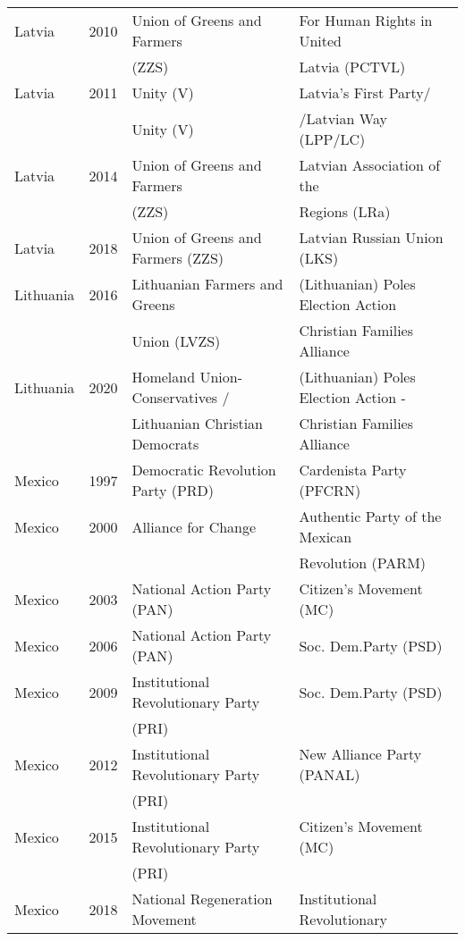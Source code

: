 {\begin{longtable}{|l|c|l|l|}
  Latvia & 2010 &   Union of Greens and Farmers     &   For Human Rights in United   \\ 
          &   &     (ZZS)   &    Latvia (PCTVL) \\ 
  Latvia & 2011 &   Unity (V) &   Latvia's First Party/   \\ 
         &      &   Unity (V) &    /Latvian Way (LPP/LC)   \\ 
  Latvia & 2014 &   Union of Greens and Farmers    &   Latvian Association of the  \\ 
         &   &     (ZZS)   &     Regions (LRa) \\
  Latvia & 2018 &   Union of Greens and Farmers (ZZS)   &   Latvian Russian Union (LKS)   \\ 
  Lithuania & 2016 &   Lithuanian Farmers and Greens  &   (Lithuanian) Poles Election Action  \\ 
         &  &    Union (LVZS) &    Christian Families Alliance  \\ 
  Lithuania & 2020 &   Homeland Union-Conservatives /  &   (Lithuanian) Poles Election Action -   \\ 
    &  &     Lithuanian Christian Democrats &    Christian Families Alliance  \\ 
  Mexico & 1997 &   Democratic Revolution Party (PRD) &   Cardenista Party (PFCRN) \\ 
  Mexico & 2000 &   Alliance for Change   &   Authentic Party of the Mexican  \\ 
               &      &         &  Revolution (PARM)   \\ 
  Mexico & 2003 &   National Action Party (PAN) &   Citizen's Movement (MC)   \\ 
  Mexico & 2006 &   National Action Party (PAN) &        Soc. Dem.Party (PSD)   \\ 
  Mexico & 2009 &   Institutional Revolutionary Party &        Soc. Dem.Party (PSD)   \\ 
               &      &        (PRI)  &     \\ 
  Mexico & 2012 &   Institutional Revolutionary Party &   New Alliance Party (PANAL) \\ 
               &      &        (PRI)  &     \\ 
  Mexico & 2015 &   Institutional Revolutionary Party  &   Citizen's Movement (MC)   \\ 
               &      &    (PRI)     &     \\ 
  Mexico & 2018 &   National Regeneration Movement &   Institutional Revolutionary \\ 

\end{longtable}}
